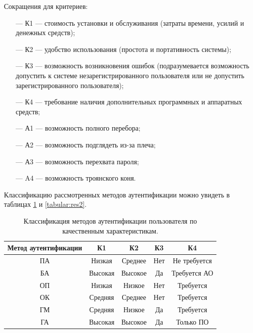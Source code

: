 Сокращения для критериев:
\begin{itemize}
    \item[---] К1 --- стоимость установки и обслуживания (затраты времени, усилий и денежных средств);
    \item[---] К2 --- удобство использования (простота и портативность системы);
    \item[---] К3 --- возможность возникновения ошибок (подразумевается возможность допустить к системе незарегистрированного пользователя или не допустить зарегистрированного пользователя);
    \item[---] К4 --- требование наличия дополнительных программных и аппаратных средств;
    \item[---] А1 --- возможность полного перебора;
    \item[---] А2 --- возможность подглядеть из-за плеча;
    \item[---] А3 --- возможность перехвата пароля;
    \item[---] A4 --- возможность троянского коня.
\end{itemize}

Классификацию рассмотренных методов аутентификации можно увидеть в таблицах \ref{tabular:res1} и \ref{tabular:res2}.

\begin{table}[h]
    \begin{center}
    \begin{threeparttable}
    \captionsetup{justification=raggedright,singlelinecheck=off}
        \caption{\label{tabular:res1} Классификация методов аутентификации пользователя по качественным характеристикам.}
        \begin{tabular}{|c|c|c|c|c|}
            \hline
            \bfseries Метод аутентификации & \bfseries К1 & \bfseries К2 & \bfseries К3 & \bfseries К4  \\
            \hline
            ПА & Низкая & Среднее & Нет & Не требуется \\ \hline
            БА & Высокая & Высокое & Да & Требуется АО \\ \hline
            ОП & Низкая & Низкое & Нет & Требуется \\ \hline
            ОК & Средняя & Среднее & Нет & Требуется \\ \hline
            ГМ & Средняя & Низкое & Да & Требуется \\ 
            \hline
            ГА & Высокая & Высокое & Да & Только ПО \\
            \hline
        \end{tabular}
    \end{threeparttable}
    \end{center}
\end{table}

